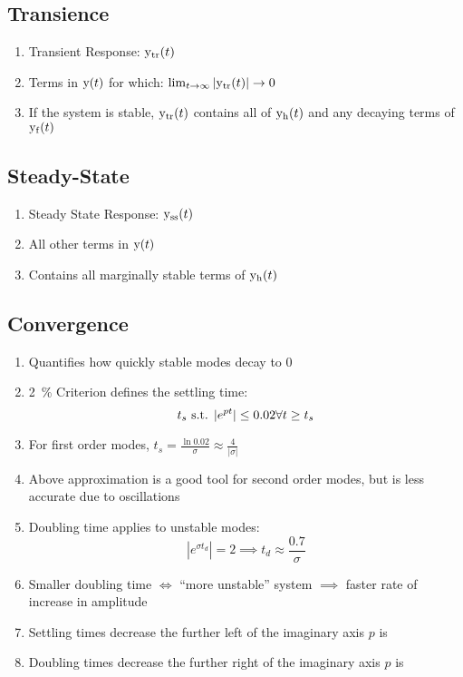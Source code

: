 \subsection*{Transience}
\begin{enumerate}
    \item Transient Response: \( \func{y_{\text{tr}}}[t] \)
    \item Terms in \( \func{y}[t] \) for which: \( \lim_{t \to \infty} | \func{y_{\text{tr}}}[t] | \to 0 \)
    \item If the system is stable, \( \func{y_{\text{tr}}}[t] \) contains all of \( \func{y_h}[t] \) and any decaying terms of \( \func{y_f}[t] \)
\end{enumerate}

\subsection*{Steady-State}
\begin{enumerate}
    \item Steady State Response: \( \func{y_{\text{ss}}}[t] \)
    \item All other terms in \( \func{y}[t] \)
    \item Contains all marginally stable terms of \( \func{y_h}[t] \)
\end{enumerate}

\subsection*{Convergence}
\begin{enumerate}
    \item Quantifies how quickly stable modes decay to 0
    \item \qty{2}{\percent} Criterion defines the settling time:
        \[
            t_s \text{ s.t. } |e^{pt}|\leq 0.02 \forall t \geq t_s
        \]
    \item For first order modes, \( t_s = \frac{\ln{0.02}}{\sigma} \approx \frac{4}{|\sigma|} \)
    \item Above approximation is a good tool for second order modes, but is less accurate due to oscillations
    \item Doubling time applies to unstable modes:
        \[
            |e^{\sigma t_d}| = 2 \implies t_d \approx \frac{0.7}{\sigma}
        \]
    \item Smaller doubling time \( \iff \) ``more unstable'' system \( \implies \) faster rate of increase in amplitude
    \item Settling times decrease the further left of the imaginary axis \( p \) is
    \item Doubling times decrease the further right of the imaginary axis \( p \) is
\end{enumerate}


